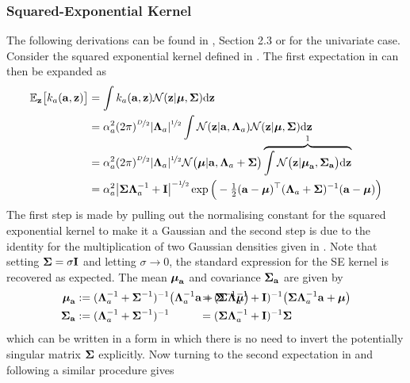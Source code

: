 \subsubsection{Squared-Exponential Kernel} 
The following derivations can be found in \cite{Dei09}, Section 2.3 or \cite{GRQM03} for the univariate case. Consider the squared exponential kernel defined in . The first expectation in  can then be expanded as
\begin{align}
\nonumber \mathbb{E}_{\mathbf{z}}\big[ k_a(\mathbf{a},\mathbf{z}) \big] 
&= \int k_a(\mathbf{a},\mathbf{z}) \mathcal{N}(\mathbf{z}|\boldsymbol{\mu},\boldsymbol{\Sigma}) \mathrm{d}\mathbf{z} \\
\nonumber &= \alpha_a^2(2\pi)^{\nicefrac{D}{2}} |\boldsymbol{\Lambda}_a|^{\nicefrac{1}{2}}  \int  \mathcal{N}(\mathbf{z}|\mathbf{a},\boldsymbol{\Lambda}_a) \mathcal{N}(\mathbf{z}|\boldsymbol{\mu},\boldsymbol{\Sigma})  \mathrm{d}\mathbf{z}   \\[-0.3cm]
\nonumber &= \alpha_a^2 (2\pi)^{\nicefrac{D}{2}} |\boldsymbol{\Lambda}_a|^{\nicefrac{1}{2}} \mathcal{N}\big(\boldsymbol{\mu}|\mathbf{a},\boldsymbol{\Lambda}_a+\boldsymbol{\Sigma}\big) 
\overbrace{ \int \mathcal{N}\big(\mathbf{z}|\boldsymbol{\mu}_{\mathbf{a}},\boldsymbol{\Sigma}_{\mathbf{a}} \big)  \mathrm{d}\mathbf{z} }^{ 1 }   \\
&=  \alpha_a^2  \big|\boldsymbol{\Sigma}\boldsymbol{\Lambda}_a^{-1} + \mathbf{I}\big|^{-\nicefrac{1}{2}} \exp\Big( -\tfrac{1}{2}(\mathbf{a}-\boldsymbol{\mu})^\top(\boldsymbol{\Lambda}_a+\boldsymbol{\Sigma})^{-1} (\mathbf{a}-\boldsymbol{\mu})\Big) 
\label{eqn:SEpropM}
\end{align}
The first step is made by pulling out the normalising constant for the squared exponential kernel to make it a Gaussian and the second step is due to the identity for the multiplication of two Gaussian densities given in . Note that setting $\boldsymbol{\Sigma} = \sigma\mathbf{I}$ and letting $\sigma \rightarrow 0$, the standard expression for the SE kernel is recovered as expected. The mean $\boldsymbol{\mu}_{\mathbf{a}}$ and covariance $\boldsymbol{\Sigma}_{\mathbf{a}}$ are given by
\begin{align}
\bm_{\ba} &:= (\bLa_a\inv + \bS\inv)\inv \big(\bLa_a\inv\ba + \bS\inv\bm \big)
&&\!\!\!\!\!\!\!\!\!\!\!\!\!\!\!\!\!\!\!\!\!\!\!\!\!\!\!\!\!\!\!\!\!=  (\bS\bLa_a\inv + \bI)\inv \big( \bS\bLa_a\inv\ba + \bm \big)
\label{eqn:muA} \\
\bS_{\ba} &:= (\bLa_a\inv + \bS\inv)\inv
&&\!\!\!\!\!\!\!\!\!\!\!\!\!\!\!\!\!\!\!\!\!\!\!\!\!\!\!\!\!\!\!\!\!= (\bS\bLa_a\inv + \bI)\inv \bS
\label{eqn:sigA}
\end{align}
which can be written in a form in which there is no need to invert the potentially singular matrix $\boldsymbol{\Sigma}$ explicitly.
Now turning to the second expectation in  and following a similar procedure gives
